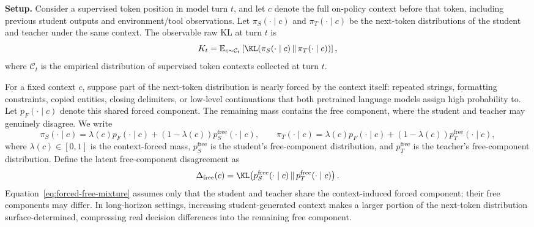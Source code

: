 \textbf{Setup.}
Consider a supervised token position in model turn $t$, and let $c$ denote the
full on-policy context before that token, including previous student outputs and
environment/tool observations. Let $\pi_S(\cdot\mid c)$ and
$\pi_T(\cdot\mid c)$ be the next-token distributions of the student and teacher
under the same context. The observable raw KL at turn $t$ is
\begin{equation}
K_t
  = \mathbb{E}_{c\sim\mathcal{C}_t}
  \left[
  \KL\!\left(\pi_S(\cdot\mid c)\,\|\,\pi_T(\cdot\mid c)\right)
  \right],
\label{eq:observed-turn-kl}
\end{equation}
where $\mathcal{C}_t$ is the empirical distribution of supervised token contexts
collected at turn $t$. 

For a fixed context $c$, suppose part of the next-token distribution is nearly
forced by the context itself: repeated strings, formatting constraints, copied
entities, closing delimiters, or low-level continuations that both pretrained
language models assign high probability to. Let $p_F(\cdot\mid c)$ denote this
shared forced component. The remaining mass contains the free component, where
the student and teacher may genuinely disagree. We write
\begin{equation}
\pi_S(\cdot\mid c)
  = \lambda(c) p_F(\cdot\mid c)
    + (1-\lambda(c))p_S^{\mathrm{free}}(\cdot\mid c),
\qquad
\pi_T(\cdot\mid c)
  = \lambda(c) p_F(\cdot\mid c)
    + (1-\lambda(c))p_T^{\mathrm{free}}(\cdot\mid c),
\label{eq:forced-free-mixture}
\end{equation}
where $\lambda(c)\in[0,1]$ is the context-forced mass,
$p_S^{\mathrm{free}}$ is the student's free-component distribution, and
$p_T^{\mathrm{free}}$ is the teacher's free-component distribution. Define the
latent free-component disagreement as
\begin{equation}
\Delta_{\mathrm{free}}(c)
  =
  \KL\!\left(
  p_S^{\mathrm{free}}(\cdot\mid c)
  \,\|\,
  p_T^{\mathrm{free}}(\cdot\mid c)
  \right).
\label{eq:free-component-disagreement}
\end{equation}
Equation~\ref{eq:forced-free-mixture} assumes only that the student and teacher share the context-induced forced component; their free components may differ. In long-horizon settings, increasing student-generated context makes a larger portion of the next-token distribution surface-determined, compressing real decision differences into the remaining free component.

